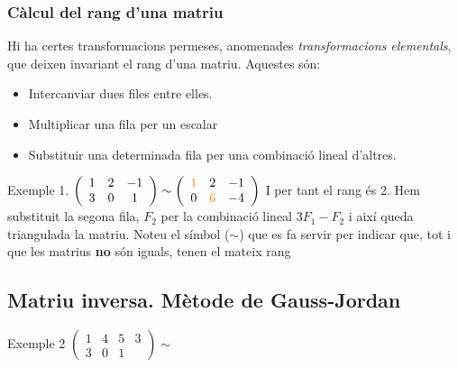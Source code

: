 \documentclass{beamer}
\begin{document}
\begin{frame}\frametitle{Càlcul del rang d'una matriu}
Hi ha certes transformacions permeses, anomenades \emph{transformacions elementals}, que deixen invariant el rang d'una matriu. Aquestes són:
\begin{itemize}
\item
Intercanviar dues files entre elles.
\item
Multiplicar una fila per un escalar
\item
Substituir una determinada fila per una combinació lineal d'altres.
\end{itemize}
\begin{exampleblock}{Exemple 1.}
$\left(\begin{array}{ccc}
1 & 2 & -1\\
3 & 0 & 1\end{array}\right)\sim\left(\begin{array}{ccc}
{\color{orange}1} & 2 & -1\\
0 & {\color{orange}6} & -4\end{array}\right)$  I per tant el rang és 2. Hem substituit la segona fila, $F_{2}$ per la combinació lineal $3F_{1}-F_{2}$ i així queda triangulada la matriu. Noteu el símbol ($\mathbf{\sim}$) que es fa servir per indicar que, tot i que les matrius \textbf{no} són iguals, tenen el mateix rang
\end{exampleblock}
\end{frame}
\subsection{Matriu inversa. Mètode de Gauss-Jordan}

\begin{frame}
\begin{exampleblock}{Exemple 2}
$\left(\begin{array}{cccc}
1 & 4 & 5 & 3\\
3 & 0 & 1\end{array}\right)\sim$
\end{exampleblock}

\end{frame}

\begin{frame}

\end{frame}
\end{document}
